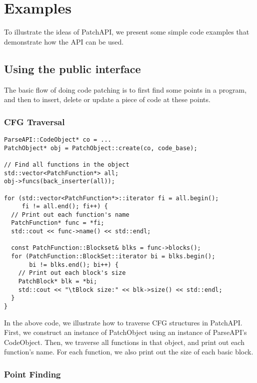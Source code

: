\section{Examples} \label{sec-example}
To illustrate the ideas of PatchAPI, we present some simple code examples that
demonstrate how the API can be used.

\subsection{Using the public interface}
The basic flow of doing code patching is to first find some points in a program,
and then to insert, delete or update a piece of code at these points.
\subsubsection{CFG Traversal}
\lstset{numbers=left}
\begin{lstlisting}[caption=Example of CFG traversal]
ParseAPI::CodeObject* co = ...
PatchObject* obj = PatchObject::create(co, code_base);

// Find all functions in the object
std::vector<PatchFunction*> all;
obj->funcs(back_inserter(all));

for (std::vector<PatchFunction*>::iterator fi = all.begin();
     fi != all.end(); fi++) {
  // Print out each function's name
  PatchFunction* func = *fi;
  std::cout << func->name() << std::endl;

  const PatchFunction::Blockset& blks = func->blocks();
  for (PatchFunction::BlockSet::iterator bi = blks.begin();
       bi != blks.end(); bi++) {
    // Print out each block's size
    PatchBlock* blk = *bi;
    std::cout << "\tBlock size:" << blk->size() << std::endl;
  }
}
\end{lstlisting}
In the above code, we illustrate how to traverse CFG structures in
PatchAPI. First, we construct an instance of PatchObject using an instance of
ParseAPI's CodeObject. Then, we traverse all functions in that object, and print
out each function's name. For each function, we also print out the size of each
basic block.

\subsubsection{Point Finding} \label{sec-example-pt}

